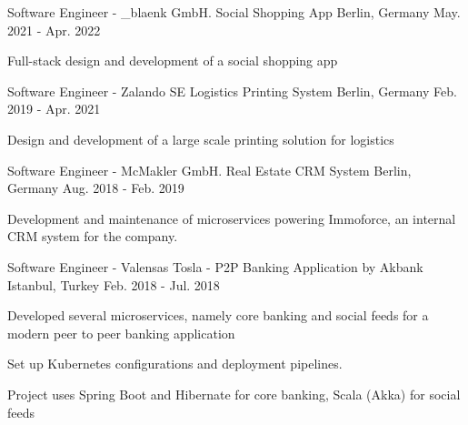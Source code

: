 

\begin{cventries}

\cventry
{Software Engineer - \_blaenk GmbH.}
{Social Shopping App}
{Berlin, Germany}
{May. 2021 - Apr. 2022}
{
  \begin{cvitems}
    \item {Full-stack design and development of a social shopping app}
  \end{cvitems}
}   

  \cventry
    {Software Engineer - Zalando SE}
    {Logistics Printing System}
    {Berlin, Germany}
    {Feb. 2019 - Apr. 2021}
    {
      \begin{cvitems}
        \item {Design and development of a large scale printing solution for logistics}
      \end{cvitems}
    } 


  \cventry
    {Software Engineer - McMakler GmbH.}
    {Real Estate CRM System}
    {Berlin, Germany}
    {Aug. 2018 - Feb. 2019}
    {
      \begin{cvitems}
        \item {Development and maintenance of microservices powering Immoforce, an internal CRM system for the company.}
      \end{cvitems}
    } 

  \cventry
    {Software Engineer - Valensas}
    {Tosla - P2P Banking Application by Akbank}
    {Istanbul, Turkey}
    {Feb. 2018 - Jul. 2018}
    {
      \begin{cvitems}
        \item {Developed several microservices, namely core banking and social feeds for a modern peer to peer banking application}
        \item {Set up Kubernetes configurations and deployment pipelines.}
        \item {Project uses Spring Boot and Hibernate for core banking, Scala (Akka) for social feeds}
      \end{cvitems}
    } 


\end{cventries}
